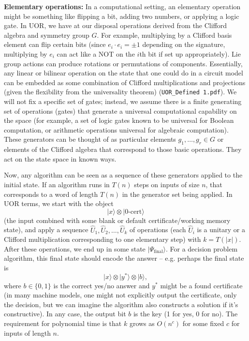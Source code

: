 \documentclass[11pt]{article}
\begin{document}
\textbf{Elementary operations:} In a computational setting, an elementary operation might be something like flipping a bit, adding two numbers, or applying a logic gate. In UOR, we have at our disposal operations derived from the Clifford algebra and symmetry group \(G\). For example, multiplying by a Clifford basis element can flip certain bits (since \(e_i \cdot e_i = \pm1\) depending on the signature, multiplying by \(e_i\) can act like a NOT on the \(i\)th bit if set up appropriately). Lie group actions can produce rotations or permutations of components. Essentially, any linear or bilinear operation on the state that one could do in a circuit model can be embedded as some combination of Clifford multiplications and projections (given the flexibility from the universality theorem) (\texttt{UOR\_Defined 1.pdf}). We will not fix a specific set of gates; instead, we assume there is a finite generating set of operations (gates) that generate a universal computational capability on the space (for example, a set of logic gates known to be universal for Boolean computation, or arithmetic operations universal for algebraic computation). These generators can be thought of as particular elements \(g_1,\dots,g_r \in G\) or elements of the Clifford algebra that correspond to those basic operations. They act on the state space in known ways.

Now, any algorithm can be seen as a sequence of these generators applied to the initial state. If an algorithm runs in \(T(n)\) steps on inputs of size \(n\), that corresponds to a word of length \(T(n)\) in the generator set being applied. In UOR terms, we start with the object
\[
|x\rangle \otimes |0\text{-cert}\rangle
\]
(the input combined with some blank or default certificate/working memory state), and apply a sequence \(\hat{U}_1, \hat{U}_2, \dots, \hat{U}_k\) of operations (each \(\hat{U}_i\) is a unitary or a Clifford multiplication corresponding to one elementary step) with \(k = T(|x|)\). After these operations, we end up in some state \(|\Psi_{\text{final}}\rangle\). For a decision problem algorithm, this final state should encode the answer -- e.g. perhaps the final state is
\[
|x\rangle \otimes |y^*\rangle \otimes |b\rangle,
\]
where \(b \in \{0,1\}\) is the correct yes/no answer and \(y^*\) might be a found certificate (in many machine models, one might not explicitly output the certificate, only the decision, but we can imagine the algorithm also constructs a solution if it’s constructive). In any case, the output bit \(b\) is the key (1 for yes, 0 for no). The requirement for polynomial time is that \(k\) grows as \(O(n^c)\) for some fixed \(c\) for inputs of length \(n\).
\end{document}
